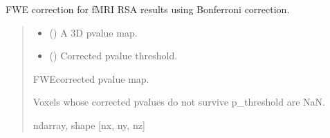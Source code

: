 \documentclass[letterpaper,10pt,english]{sphinxhowto}
\begin{document}

\begin{fulllineitems}
\label{\detokenize{stuff:neurora.stuff.fwe_correct}}
\pysigstartsignatures
{}
\pysigstopsignatures
\sphinxAtStartPar
FWE correction for fMRI RSA results using Bonferroni correction.
\begin{quote}\begin{description}
\begin{itemize}
\item {} 
\sphinxAtStartPar
{} (\sphinxstyleliteralemphasis{\sphinxupquote{, }}\sphinxstyleliteralemphasis{\sphinxupquote{ {[}}}\sphinxstyleliteralemphasis{\sphinxupquote{, }}\sphinxstyleliteralemphasis{\sphinxupquote{, }}\sphinxstyleliteralemphasis{\sphinxupquote{{]}}}) \textendash{} A 3\sphinxhyphen{}D p\sphinxhyphen{}value map.

\item {} 
\sphinxAtStartPar
{} () \textendash{} Corrected p\sphinxhyphen{}value threshold.

\end{itemize}

\sphinxAtStartPar

\sphinxAtStartPar
{} \textendash{} FWE\sphinxhyphen{}corrected p\sphinxhyphen{}value map.

\sphinxAtStartPar
Voxels whose corrected p\sphinxhyphen{}values do not survive p\_threshold are NaN.


\sphinxAtStartPar
ndarray, shape {[}nx, ny, nz{]}

\end{description}\end{quote}

\end{fulllineitems}
\end{document}
